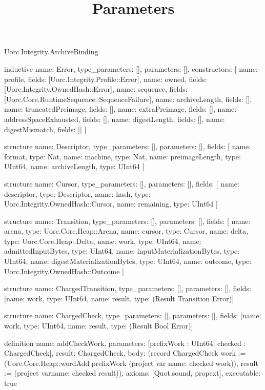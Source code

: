 \begin{lexlean}{Uorc.Integrity.ArchiveBinding}
\title{Parameters}
\begin{semanticmodule}
inductive{
  name: Error,
  type_parameters: [],
  parameters: [],
  constructors: [
    {name: profile, fields: [Uorc.Integrity.Profile::Error]},
    {name: owned, fields: [Uorc.Integrity.OwnedHash::Error]},
    {name: sequence, fields: [Uorc.Core.RuntimeSequence::SequenceFailure]},
    {name: archiveLength, fields: []},
    {name: truncatedPreimage, fields: []},
    {name: extraPreimage, fields: []},
    {name: addressSpaceExhausted, fields: []},
    {name: digestLength, fields: []},
    {name: digestMismatch, fields: []}
  ]
}

structure{
  name: Descriptor,
  type_parameters: [],
  parameters: [],
  fields: [
    {name: format, type: Nat},
    {name: machine, type: Nat},
    {name: preimageLength, type: UInt64},
    {name: archiveLength, type: UInt64}
  ]
}

structure{
  name: Cursor,
  type_parameters: [],
  parameters: [],
  fields: [
    {name: descriptor, type: Descriptor},
    {name: hash, type: Uorc.Integrity.OwnedHash::Cursor},
    {name: remaining, type: UInt64}
  ]
}

structure{
  name: Transition,
  type_parameters: [],
  parameters: [],
  fields: [
    {name: arena, type: Uorc.Core.Heap::Arena},
    {name: cursor, type: Cursor},
    {name: delta, type: Uorc.Core.Heap::Delta},
    {name: work, type: UInt64},
    {name: admittedInputBytes, type: UInt64},
    {name: inputMaterializationBytes, type: UInt64},
    {name: digestMaterializationBytes, type: UInt64},
    {name: outcome, type: Uorc.Integrity.OwnedHash::Outcome}
  ]
}

structure{
  name: ChargedTransition,
  type_parameters: [],
  parameters: [],
  fields: [{name: work, type: UInt64}, {name: result, type: (Result Transition Error)}]
}

structure{
  name: ChargedCheck,
  type_parameters: [],
  parameters: [],
  fields: [{name: work, type: UInt64}, {name: result, type: (Result Bool Error)}]
}

definition{
  name: addCheckWork,
  parameters: [prefixWork : UInt64, checked : ChargedCheck],
  result: ChargedCheck,
  body: (record ChargedCheck {work := (Uorc.Core.Heap::wordAdd prefixWork (project var{
    name: checked
  } work)), result := (project var{name: checked} result)}),
  axioms: [Quot.sound, propext],
  executable: true
}


\end{semanticmodule}
\end{lexlean}
